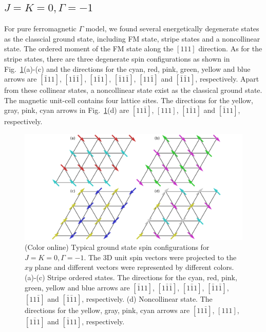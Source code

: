 \documentclass[aps,prb,reprint,amsfonts,amsmath,amssymb,showpacs,groupedaddress,superscriptaddress]{revtex4-1}
\begin{document}
\subsection{$J=K=0, \Gamma=-1$}
For pure ferromagnetic $\Gamma$ model, we found several energetically degenerate states as the classcial ground state, including FM state, stripe states and a noncollinear state. The ordered moment of the FM state along the $[111]$ direction. As for the stripe states, there are three degenerate spin configurations as shown in Fig.~\ref{fig:GSForNegativeGamma}(a)-(c) and the directions for the cyan, red, pink, green, yellow and blue arrows are $[\bar{1}11]$, $[1\bar{1}\bar{1}]$, $[1\bar{1}1]$, $[\bar{1}1\bar{1}]$, $[11\bar{1}]$ and $[\bar{1}\bar{1}1]$, respectively. Apart from these collinear states, a noncollinear state exist as the classical ground state. The magnetic unit-cell contains four lattice sites. The directions for the yellow, gray, pink, cyan arrows in Fig.~\ref{fig:GSForNegativeGamma}(d) are $[11\bar{1}]$, $[111]$, $[1\bar{1}1]$ and $[\bar{1}11]$, respectively.
\begin{figure}
    \includegraphics[width=\columnwidth]{fig/SpinConfigForNegativeGamma.pdf}
    \caption{\label{fig:GSForNegativeGamma}(Color online) Typical ground state spin configurations for $J=K=0, \Gamma=-1$. The 3D unit spin vectors were projected to the $xy$ plane and different vectors were represented by different colors. (a)-(c) Stripe ordered states. The directions for the cyan, red, pink, green, yellow and blue arrows are $[\bar{1}11]$, $[1\bar{1}\bar{1}]$, $[1\bar{1}1]$, $[\bar{1}1\bar{1}]$, $[11\bar{1}]$ and $[\bar{1}\bar{1}1]$, respectively. (d) Noncollinear state. The directions for the yellow, gray, pink, cyan arrows are $[11\bar{1}]$, $[111]$, $[1\bar{1}1]$ and $[\bar{1}11]$, respectively.}
\end{figure}
\end{document}
